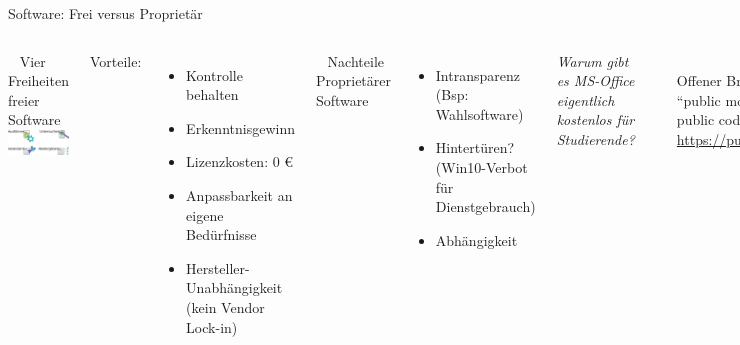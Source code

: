 \documentclass[t]{beamer}
\begin{document}
\begin{frame}[label=wb]{\color{fg}Software: Frei versus Proprietär}

\begin{columns}


~
Vier Freiheiten freier Software\\[4mm]
\includegraphics[width=40mm]{img-src/vier-freiheiten}
\pause

Vorteile:
\begin{itemize}
\item Kontrolle behalten
\item Erkenntnisgewinn
\item Lizenzkosten: 0 €
\item Anpassbarkeit an eigene Bedürfnisse
\item Hersteller-Unabhängigkeit\\[-2mm] {\tiny (kein Vendor Lock-in)}

\end{itemize}


~ 
Nachteile Proprietärer Software
\begin{itemize}
 \item Intransparenz {\tiny (Bsp: Wahlsoftware)}
 \item Hintertüren? {\tiny (Win10-Verbot für Dienstgebrauch)}
 \item Abhängigkeit
\end{itemize}
 \pause
 \bigskip
 
 
 \textit{Warum gibt es MS-Office eigentlich { kostenlos} für Studierende?}
 
 \pause
 \pause
 \medskip
 \rule{\textwidth}{1pt}\\[2mm]
 Offener Brief:\\
 
 "`public money $\Rightarrow$ public code"'\\[2mm]
 
 \url{https://publiccode.eu}


\end{columns}



\end{frame}
\end{document}

